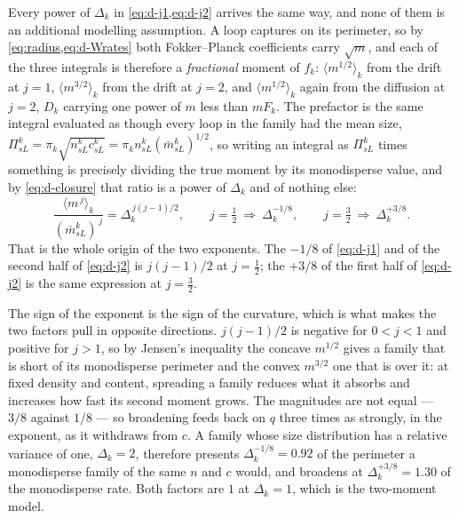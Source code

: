 Every power of $\Delta_k$ in \cref{eq:d-j1,eq:d-j2} arrives the same way, and
none of them is an additional modelling assumption. A loop captures on its
perimeter, so by \cref{eq:radius,eq:d-Wrates} both Fokker--Planck coefficients
carry $\sqrt m$, and each of the three integrals is therefore a \emph{fractional}
moment of $f_k$: $\langle m^{1/2}\rangle_k$ from the drift at $j=1$,
$\langle m^{3/2}\rangle_k$ from the drift at $j=2$, and
$\langle m^{1/2}\rangle_k$ again from the diffusion at $j=2$, $D_k$ carrying one
power of $m$ less than $mF_k$. The prefactor is the same integral evaluated as
though every loop in the family had the mean size,
$\Pi^k_{sL}=\pi_k\sqrt{n^k_{sL}c^k_{sL}}=\pi_kn^k_{sL}(\bar m^k_{sL})^{1/2}$, so
writing an integral as $\Pi^k_{sL}$ times something is precisely dividing the
true moment by its monodisperse value, and by \cref{eq:d-closure} that ratio is
a power of $\Delta_k$ and of nothing else:
\begin{equation}
  \frac{\langle m^{\,j}\rangle_k}{(\bar m^k_{sL})^{\,j}}=\Delta_k^{\,j(j-1)/2},
  \qquad
  j=\tfrac12\ \Rightarrow\ \Delta_k^{-1/8},
  \qquad
  j=\tfrac32\ \Rightarrow\ \Delta_k^{+3/8}.
  \label{eq:d-jensen}
\end{equation}
That is the whole origin of the two exponents. The $-1/8$ of \cref{eq:d-j1} and
of the second half of \cref{eq:d-j2} is $j(j-1)/2$ at $j=\tfrac12$; the $+3/8$ of
the first half of \cref{eq:d-j2} is the same expression at $j=\tfrac32$.

The sign of the exponent is the sign of the curvature, which is what makes the
two factors pull in opposite directions. $j(j-1)/2$ is negative for $0<j<1$ and
positive for $j>1$, so by Jensen's inequality the concave $m^{1/2}$ gives a
family that is short of its monodisperse perimeter and the convex $m^{3/2}$ one
that is over it: at fixed density and content, spreading a family reduces what it
absorbs and increases how fast its second moment grows. The magnitudes are not
equal --- $3/8$ against $1/8$ --- so broadening feeds back on $q$ three times as
strongly, in the exponent, as it withdraws from $c$. A family whose size
distribution has a relative variance of one, $\Delta_k=2$, therefore presents
$\Delta_k^{-1/8}=0.92$ of the perimeter a monodisperse family of the same $n$ and
$c$ would, and broadens at $\Delta_k^{+3/8}=1.30$ of the monodisperse rate. Both
factors are $1$ at $\Delta_k=1$, which is the two-moment model.

